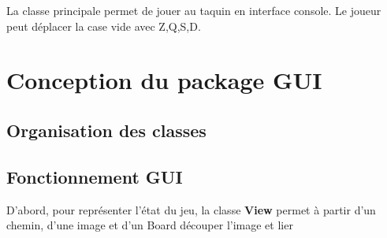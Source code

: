 \documentclass[a4paper,12pt]{article} %
\begin{document}
La classe principale permet de jouer au taquin en interface console. Le joueur peut déplacer la case vide avec Z,Q,S,D.

\section{Conception du package GUI}

\subsection{Organisation des classes}


\subsection{Fonctionnement GUI}

D'abord, pour représenter l'état du jeu, la classe \textbf{View} permet à partir d'un chemin, d'une image et d'un Board découper l'image et lier
\end{document}

